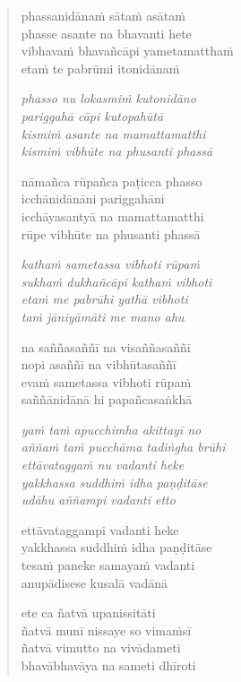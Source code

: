 \begin{verse}
phassanidānaṁ sātaṁ asātaṁ\\
phasse asante na bhavanti hete\\
vibhavaṁ bhavañcāpi yametamatthaṁ\\
etaṁ te pabrūmi itonidānaṁ

\emph{phasso nu lokasmiṁ kutonidāno\\
pariggahā cāpi kutopahūtā}\\
\emph{kismiṁ asante na mamattamatthi\\
kismiṁ vibhūte na phusanti phassā}

nāmañca rūpañca paṭicca phasso\\
icchānidānāni pariggahāni\\
icchāyasantyā na mamattamatthi\\
rūpe vibhūte na phusanti phassā

\emph{kathaṁ sametassa vibhoti rūpaṁ\\
sukhaṁ dukhañcāpi kathaṁ vibhoti}\\
\emph{etaṁ me pabrūhi yathā vibhoti\\
taṁ jāniyāmāti me mano ahu}

na saññasaññī na visaññasaññī\\
nopi asaññī na vibhūtasaññī\\
evaṁ sametassa vibhoti rūpaṁ\\
saññānidānā hi papañcasaṅkhā

\emph{yaṁ taṁ apucchimha akittayī no}\\
\emph{aññaṁ taṁ pucchāma tadiṅgha brūhi}\\
\emph{ettāvataggaṁ nu vadanti heke}\\
\emph{yakkhassa suddhiṁ idha paṇḍitāse}\\
\emph{udāhu aññampi vadanti etto}

ettāvataggampi vadanti heke\\
yakkhassa suddhiṁ idha paṇḍitāse\\
tesaṁ paneke samayaṁ vadanti\\
anupādisese kusalā vadānā

ete ca ñatvā upanissitāti\\
ñatvā munī nissaye so vimaṁsī\\
ñatvā vimutto na vivādameti\\
bhavābhavāya na sameti dhīroti

\end{verse}

